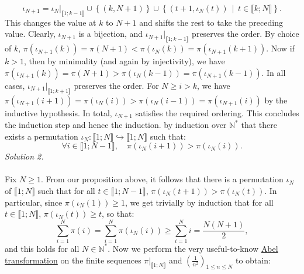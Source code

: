 \begin{solution}
{    \[
        \iota_{N+1} = \iota_N|_{\llbracket1;k-1\rrbracket} \cup \left\{\left(k, N+1\right)\right\} \cup \left\{\left(t+1, \iota_N\left(t\right)\right)\,\middle|\, t \in \llbracket k;N \rrbracket\right\}.
    \]
    This changes the value at \( k \) to \( N+1 \) and shifts the rest to take the preceding value. Clearly, \( \iota_{N+1} \) is a bijection, and \( \iota_{N+1}|_{\llbracket1;k-1\rrbracket} \) preserves the order. By choice of \( k \), \( \pi\left(\iota_{N+1}\left(k\right)\right) = \pi\left(N+1\right) < \pi\left(\iota_N\left(k\right)\right) = \pi\left(\iota_{N+1}\left(k+1\right)\right) \). Now if \( k > 1 \), then by minimality (and again by injectivity), we have \( \pi\left(\iota_{N+1}\left(k\right)\right) = \pi\left(N+1\right) > \pi\left(\iota_N\left(k-1\right)\right) = \pi\left(\iota_{N+1}\left(k-1\right)\right) \). In all cases, \( \iota_{N+1}|_{\llbracket1;k+1\rrbracket} \) preserves the order. For \( N \geq i > k \), we have \( \pi\left(\iota_{N+1}\left(i+1\right)\right) = \pi\left(\iota_N\left(i\right)\right) > \pi\left(\iota_N\left(i-1\right)\right) = \pi\left(\iota_{N+1}\left(i\right)\right) \) by the inductive hypothesis. In total, \( \iota_{N+1} \) satisfies the required ordering. This concludes the induction step and hence the induction.} by induction over \( \mathbb{N}^{*} \) that there exists a permutation \( \iota_N \colon \llbracket 1;N \rrbracket \hookrightarrow \llbracket 1;N \rrbracket \) such that:
    \[
        \forall i \in \llbracket 1;N-1 \rrbracket,\quad \pi\left(\iota_N\left(i+1\right)\right) > \pi\left(\iota_N\left(i\right)\right).
    \]
    \textit{Solution 2.}
    \\\\
    Fix \( N \geq 1 \). From our proposition above, it follows that there is a permutation \( \iota_N \) of \( \llbracket 1;N \rrbracket \) such that for all \( t \in \llbracket 1;N-1 \rrbracket \), \( \pi\left(\iota_N\left(t+1\right)\right) > \pi\left(\iota_N\left(t\right)\right) \). In particular, since \( \pi\left(\iota_N\left(1\right)\right) \geq 1 \), we get trivially by induction that for all \( t \in \llbracket 1;N \rrbracket \), \( \pi\left(\iota_N\left(t\right)\right) \geq t \), so that:
    \[
        \sum_{i=1}^{N} \pi\left(i\right) = \sum_{i=1}^{N} \pi\left(\iota_N\left(i\right)\right) \geq \sum_{i=1}^{N} i = \frac{N\left(N+1\right)}{2},
    \]
    and this holds for all \( N \in \mathbb{N}^{*} \). Now we perform the very useful-to-know \href{https://en.wikipedia.org/wiki/Summation_by_parts}{Abel transformation} on the finite sequences \( \pi|_{\llbracket 1; N \rrbracket} \) and \( \left(\frac{1}{n^2}\right)_{1 \leq n \leq N} \) to obtain:

\end{solution}
